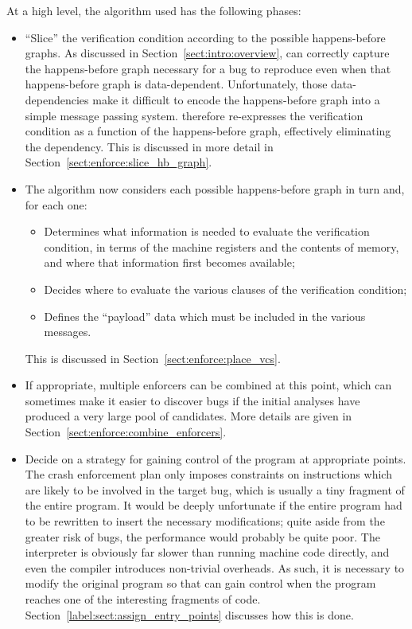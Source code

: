 At a high level, the algorithm used has the following phases:

\begin{itemize}
\item
  ``Slice'' the verification condition according to the possible
  happens-before graphs. As discussed in
  Section~\ref{sect:intro:overview}, {\technique} can correctly
  capture the happens-before graph necessary for a bug to reproduce
  even when that happens-before graph is data-dependent.
  Unfortunately, those data-dependencies make it difficult to encode
  the happens-before graph into a simple message passing system.
  {\Technique} therefore re-expresses the verification condition as a
  function of the happens-before graph, effectively eliminating the
  dependency.  This is discussed in more detail in
  Section~\ref{sect:enforce:slice_hb_graph}.
\item
  The algorithm now considers each possible happens-before graph in
  turn and, for each one:

  \begin{itemize}
  \item
    Determines what information is needed to evaluate the verification
    condition, in terms of the machine registers and the contents of
    memory, and where that information first becomes available;
  \item
    Decides where to evaluate the various clauses of the verification
    condition;
  \item
    Defines the ``payload'' data which must be included in the various
    messages.
  \end{itemize}

  This is discussed in Section~\ref{sect:enforce:place_vcs}.
\item
  If appropriate, multiple enforcers can be combined at this point,
  which can sometimes make it easier to discover bugs if the initial
  analyses have produced a very large pool of candidates.  More
  details are given in Section~\ref{sect:enforce:combine_enforcers}.
\item
  Decide on a strategy for gaining control of the program at
  appropriate points.  The crash enforcement plan only imposes
  constraints on instructions which are likely to be involved in the
  target bug, which is usually a tiny fragment of the entire program.
  It would be deeply unfortunate if the entire program had to be
  rewritten to insert the necessary modifications; quite aside from
  the greater risk of bugs, the performance would probably be quite
  poor.  The interpreter is obviously far slower than running machine
  code directly, and even the compiler introduces non-trivial
  overheads.  As such, it is necessary to modify the original program
  so that {\technique} can gain control when the program reaches one
  of the interesting fragments of code.
  Section~\ref{label:sect:assign_entry_points} discusses how this is
  done.


\end{itemize}
